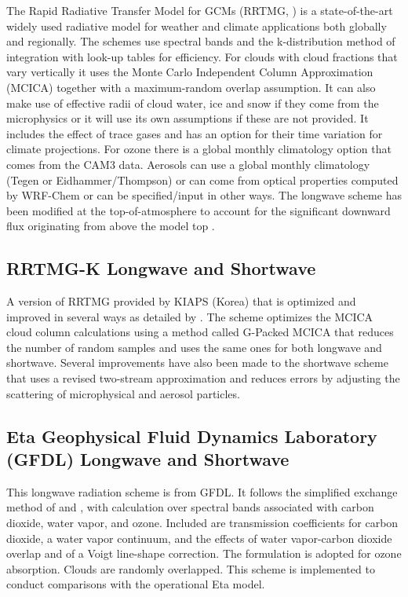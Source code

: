 The Rapid Radiative Transfer Model for GCMs (RRTMG, \citet{iacono08}) is a state-of-the-art
widely used radiative model for weather and climate applications both globally
and regionally. The schemes use spectral bands and the k-distribution method of
integration with look-up tables for efficiency. For clouds with cloud fractions that vary vertically it uses the 
Monte Carlo Independent Column Approximation (MCICA) together with a 
maximum-random overlap assumption. It can also make use of effective radii
of cloud water, ice and snow if they come from the microphysics or it will use its
own assumptions if these are not provided. It includes the effect
of trace gases and has an option for their time variation for climate projections.
For ozone there is a global monthly climatology option that comes from the CAM3 data.
Aerosols can use a global monthly climatology (Tegen or Eidhammer/Thompson) or can come from
optical properties computed by WRF-Chem or can be specified/input in other ways. The longwave scheme has been
modified at the top-of-atmosphere to account for the significant downward flux originating from 
above the model top \citep{cavallo11}.

\subsection {RRTMG-K Longwave and Shortwave}

A version of RRTMG provided by KIAPS (Korea) that is optimized and improved in several ways as detailed
by \citet{baek17}. The scheme optimizes the MCICA cloud column calculations using a method called G-Packed
MCICA that reduces the number of random samples and uses the same ones for both longwave and shortwave.
Several improvements have also been made to the shortwave scheme that uses a revised two-stream
approximation and reduces errors by adjusting the scattering of microphysical and aerosol particles.
 
\subsection {Eta Geophysical Fluid Dynamics Laboratory (GFDL) Longwave and Shortwave}

This longwave radiation scheme is from GFDL. It follows the simplified exchange 
method of \citet{fels75} and \citet{schwarzkopf91}, 
with calculation over spectral bands associated with carbon dioxide, water vapor, 
and ozone. Included are \citet{schwarzkopf85} transmission coefficients for carbon 
dioxide, a \citet{roberts76} water vapor continuum, and the effects of 
water vapor-carbon dioxide overlap and of a Voigt line-shape correction.
The \citet{rodgers68} formulation is adopted for ozone absorption. 
Clouds are randomly overlapped. 
This scheme is implemented to conduct comparisons with the operational Eta model.

